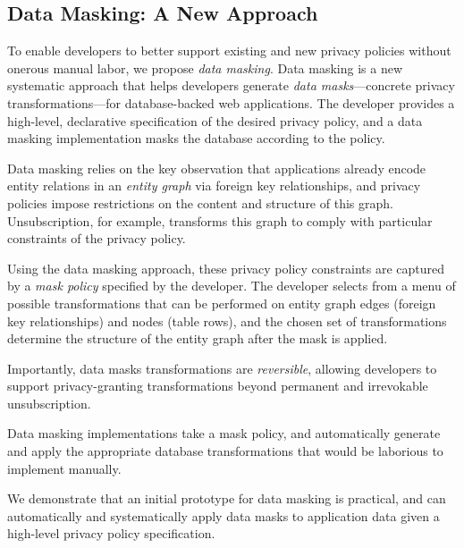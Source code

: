 \subsection{Data Masking: A New Approach}
To enable developers to better support existing and new privacy policies without onerous manual
labor, we propose \emph{data masking}.
%
Data masking is a new systematic approach that helps developers generate
\emph{data masks}---concrete privacy transformations---for database-backed web applications. The
developer provides a high-level, declarative specification of the desired privacy policy, and a data
masking implementation masks the database according to the policy.

Data masking relies on the key observation that applications already encode entity relations in an
\emph{entity graph} via foreign key relationships, and privacy policies impose restrictions on the
content and structure of this graph. Unsubscription, for example, transforms this graph to comply
with particular constraints of the privacy policy.

Using the data masking approach, these privacy policy constraints are captured by a \emph{mask
policy} specified by the developer. The developer selects from a menu of
possible transformations that can be performed on entity graph edges (foreign key relationships) and
nodes (table rows), and the chosen set of transformations determine the structure of the 
entity graph after the mask is applied. 

Importantly, data masks transformations are \emph{reversible}, allowing developers to support
privacy-granting transformations beyond permanent and irrevokable unsubscription. 

Data masking implementations take a mask policy, and automatically generate and apply the
appropriate database transformations that would be laborious to implement manually. 


We demonstrate that an initial prototype for data masking is practical, and can automatically and
systematically apply data masks to application data given a high-level privacy policy
specification.


